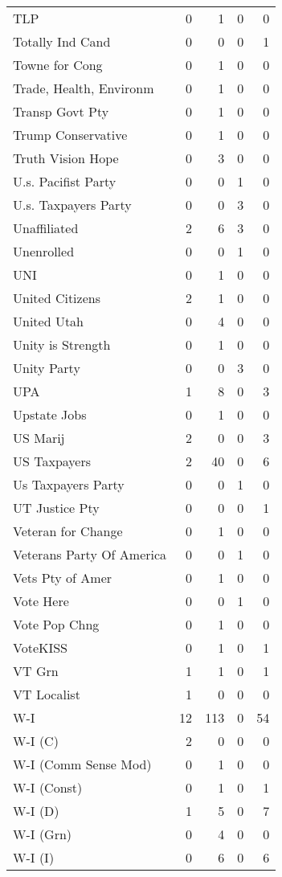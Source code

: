 \begin{supertabular}{lrrrr}
TLP & 0 & 1 & 0 & 0\\
Totally Ind Cand & 0 & 0 & 0 & 1\\
Towne for Cong & 0 & 1 & 0 & 0\\
Trade, Health, Environm & 0 & 1 & 0 & 0\\
Transp Govt Pty & 0 & 1 & 0 & 0\\
Trump Conservative & 0 & 1 & 0 & 0\\
Truth Vision Hope & 0 & 3 & 0 & 0\\
U.s. Pacifist Party & 0 & 0 & 1 & 0\\
U.s. Taxpayers Party & 0 & 0 & 3 & 0\\
Unaffiliated & 2 & 6 & 3 & 0\\
Unenrolled & 0 & 0 & 1 & 0\\
UNI & 0 & 1 & 0 & 0\\
United Citizens & 2 & 1 & 0 & 0\\
United Utah & 0 & 4 & 0 & 0\\
Unity is Strength & 0 & 1 & 0 & 0\\
Unity Party & 0 & 0 & 3 & 0\\
UPA & 1 & 8 & 0 & 3\\
Upstate Jobs & 0 & 1 & 0 & 0\\
US Marij & 2 & 0 & 0 & 3\\
US Taxpayers & 2 & 40 & 0 & 6\\
Us Taxpayers Party & 0 & 0 & 1 & 0\\
UT Justice Pty & 0 & 0 & 0 & 1\\
Veteran for Change & 0 & 1 & 0 & 0\\
Veterans Party Of America & 0 & 0 & 1 & 0\\
Vets Pty of Amer & 0 & 1 & 0 & 0\\
Vote Here & 0 & 0 & 1 & 0\\
Vote Pop Chng & 0 & 1 & 0 & 0\\
VoteKISS & 0 & 1 & 0 & 1\\
VT Grn & 1 & 1 & 0 & 1\\
VT Localist & 1 & 0 & 0 & 0\\
W-I & 12 & 113 & 0 & 54\\
W-I (C) & 2 & 0 & 0 & 0\\
W-I (Comm Sense Mod) & 0 & 1 & 0 & 0\\
W-I (Const) & 0 & 1 & 0 & 1\\
W-I (D) & 1 & 5 & 0 & 7\\
W-I (Grn) & 0 & 4 & 0 & 0\\
W-I (I) & 0 & 6 & 0 & 6\\

\end{supertabular}

